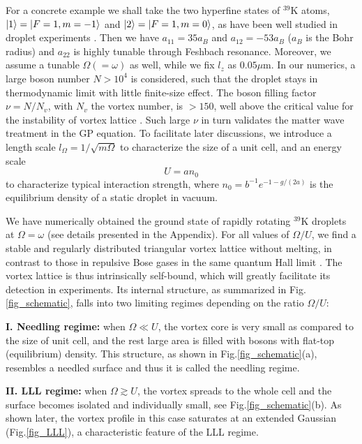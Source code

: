 \documentclass[reprint,aps,pra,twocolumn,superscriptaddress]{revtex4-1}
\begin{document}
For a concrete example we shall take the two  hyperfine states of ${}^{39}$K atoms, $\ket{1} = \ket{F=1,m=-1}$ and $\ket{2}=\ket{F=1,m=0}$, as have been well studied in droplet experiments  \cite{Semeghini2018,Cabrera2018,Cheiney2018}. Then we have $a_{11}=35a_B$ and $a_{12}=-53a_B$ ($a_B$ is the Bohr radius) and  $a_{22}$ is highly tunable through Feshbach resonance. Moreover, we assume a tunable $\Omega(=\omega)$ as well, while we fix $l_z$ as $0.05\mu$m. 
In our numerics, a large boson number $N>10^4$ is considered, such that the droplet stays in thermodynamic limit with little finite-size effect. The boson filling factor $\nu=N/N_v$, with $N_v$ the vortex number, is $> 150$, well above the critical value for the instability of vortex lattice \cite{Cooper,Sinova2002:QuantumMeltingAbsence,Baym2004_modes}. Such large $\nu$ in turn validates the matter wave treatment in the GP equation.  To facilitate later discussions, we introduce  a length scale $l_{\Omega}=1/\sqrt{m\Omega}$ to characterize the size of a unit cell, and an energy scale 
\begin{equation}
U=an_0
\end{equation}
to characterize typical interaction strength, where  $n_0=b^{-1}e^{-1-g/(2a)}$ is the equilibrium density of a static droplet in vacuum.

We have numerically obtained the ground state of rapidly rotating ${}^{39}$K droplets at $\Omega=\omega$ (see details presented in the Appendix).  For all values of $\Omega/U$, we find a stable and  regularly distributed triangular vortex lattice without melting, in contrast to those in repulsive Bose gases in the same quantum Hall limit \cite{QH_expt1, QH_expt2}. The vortex lattice is thus intrinsically self-bound, which will greatly facilitate its detection in experiments. Its internal structure, as summarized in Fig.\ref{fig_schematic},  falls into two limiting regimes depending on the ratio $\Omega/U$:

{\bf I. Needling regime:} when $\Omega\ll U$, the vortex core is very small as compared to the size of unit cell, and the rest large area is filled with bosons with flat-top (equilibrium) density. This structure, as shown in Fig.\ref{fig_schematic}(a), resembles a needled surface and thus it is called the needling regime.

{\bf II. LLL regime:} when $\Omega\gtrsim U$, the vortex spreads to the whole cell and the surface becomes isolated and individually small, see Fig.\ref{fig_schematic}(b). As shown later, the vortex profile in this case saturates at an extended Gaussian (Fig.\ref{fig_LLL}), a characteristic feature of the LLL regime.
\end{document}
